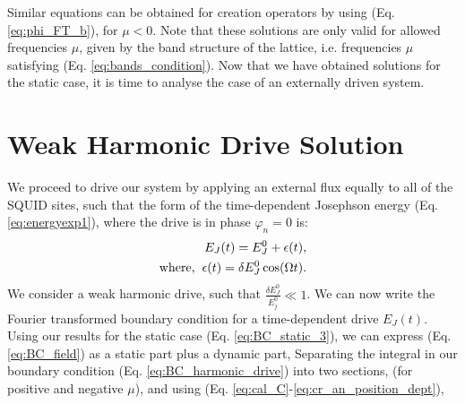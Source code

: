 %
Similar equations can be obtained for creation operators by using (Eq. \ref{eq:phi_FT_b}), for $\mu<0$. Note that these solutions are only valid for allowed frequencies $\mu$, given by the band structure of the lattice, i.e. frequencies $\mu$ satisfying (Eq. \ref{eq:bands_condition}). Now that we have obtained solutions for the static case, it is time to analyse the case of an externally driven system.

\section{Weak Harmonic Drive Solution}\label{eq:Static_Flux}

We proceed to drive our system by applying an external flux equally to all of the SQUID sites, such that the form of the time-dependent Josephson energy (Eq. \ref{eq:energyexp1}), where the drive is in phase $\varphi_n=0$ is:
%
\begin{equation}\label{eq:energy_t}
\begin{split}
    E_J(t) = E^0_J + \epsilon(t),
    \\
    \text{where,} \hspace{2mm}
    \epsilon(t) = \delta E^0_J \cos(\Omega t). 
\end{split}
\end{equation}
%
We consider a weak harmonic drive, such that $\frac{\delta E^0_J}{E^0_j} \ll 1$. We can now write the Fourier transformed boundary condition for a time-dependent drive $E_J(t)$. Using our results for the static case (Eq. \ref{eq:BC_static_3}), we can express (Eq. \ref{eq:BC_field}) as a static part plus a dynamic part,
%
Separating the integral in our boundary condition (Eq. \ref{eq:BC_harmonic_drive}) into two sections, (for positive and negative $\mu$), and using (Eq. \ref{eq:cal_C}-\ref{eq:cr_an_position_dept}),

